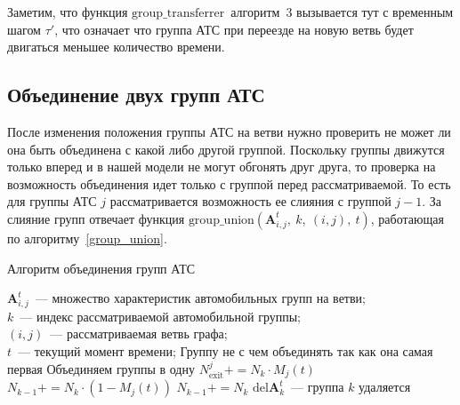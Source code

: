 Заметим, что функция \(\text{group\_transferrer}\)~алгоритм~3 вызывается тут с временным шагом \(\tau'\), что означает что группа АТС при переезде на новую ветвь будет двигаться меньшее количество времени.


\subsection{Объединение двух групп АТС}
После изменения положения группы АТС на ветви нужно проверить не может ли она быть объединена с какой либо другой группой.
Поскольку группы движутся только вперед и в нашей модели не могут обгонять друг друга, то проверка на возможность
объединения идет только с группой перед рассматриваемой.
То есть для группы АТС \(j\) рассматривается возможность ее слияния с группой \(j-1\).
За слияние групп отвечает функция \(\text{group\_union}(\mathbf{A}^t_{i,j},\ k,\ (i,j),\ t)\), работающая по алгоритму~\ref{group_union}.

\begin{algorithm}[!ht]
    \caption{Алгоритм объединения групп АТС}
    \label{group_union}
    \begin{algorithmic}
        \REQUIRE \(\mathbf{A}^t_{i,j}\)~--- множество характеристик автомобильных групп на ветви; \\
                 \(k\)~--- индекс рассматриваемой автомобильной группы; \\
                 \((i,j)\)~--- рассматриваемая ветвь графа; \\
                 \(t\)~--- текущий момент времени;
            \STATE Группу не с чем объединять так как она самая первая
        \ELSE
                \STATE Объединяем группы в одну
                    \STATE \(N^{j}_\text{exit} += N_k \cdot M_j(t)\)
                    \STATE \(N_{k-1} += N_k \cdot (1 - M_j(t))\)
                \ELSE
                    \STATE \(N_{k-1} += N_k\)
                \ENDIF
                \STATE \(\text{del} \mathbf{A}^t_k\)~--- группа \(k\) удаляется
            \ENDIF
        \ENDIF
    \end{algorithmic}
\end{algorithm}


